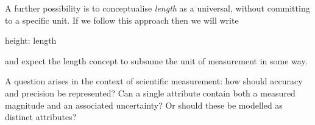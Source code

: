 A further possibility is to conceptualise \textit{length} as a universal, without committing to a specific unit. If we follow this approach then we will write
\begin{erquote}
height: length
\end{erquote}
and expect the length concept to subsume the unit of measurement in some way. 

A question arises in the context of scientific measurement: how should accuracy and precision be represented? Can a single attribute contain both a measured magnitude and an associated uncertainty? Or should these be modelled as distinct attributes?






